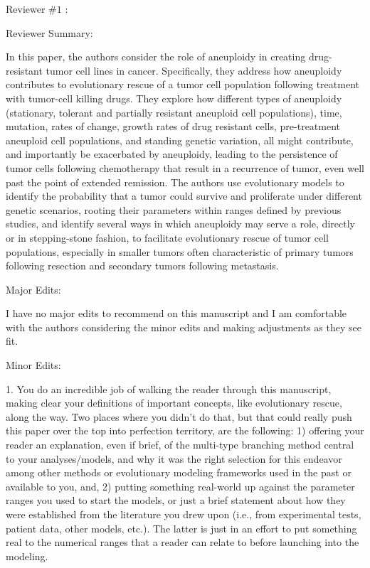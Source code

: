 \documentclass[11pt,a4paper]{article}
\begin{document}
Reviewer $\#1$ :

Reviewer Summary:

In this paper, the authors consider the role of aneuploidy in creating drug-resistant tumor cell lines in cancer. Specifically, they address how aneuploidy contributes to evolutionary rescue of a tumor cell population following treatment with tumor-cell killing drugs. They explore how different types of aneuploidy (stationary, tolerant and partially resistant aneuploid cell populations), time, mutation, rates of change, growth rates of drug resistant cells, pre-treatment aneuploid cell populations, and standing genetic variation, all might contribute, and importantly be exacerbated by aneuploidy, leading to the persistence of tumor cells following chemotherapy that result in a recurrence of tumor, even well past the point of extended remission. The authors use evolutionary models to identify the probability that a tumor could survive and proliferate under different genetic scenarios, rooting their parameters within ranges defined by previous studies, and identify several ways in which aneuploidy may serve a role, directly or in stepping-stone fashion, to facilitate evolutionary rescue of tumor cell populations, especially in smaller tumors often characteristic of primary tumors following resection and secondary tumors following metastasis.

Major Edits:

I have no major edits to recommend on this manuscript and I am comfortable with the authors considering the minor edits and making adjustments as they see fit.

Minor Edits:

1. You do an incredible job of walking the reader through this manuscript, making clear your definitions of important concepts, like evolutionary rescue, along the way. Two places where you didn't do that, but that could really push this paper over the top into perfection territory, are the following: 1) offering your reader an explanation, even if brief, of the multi-type branching method central to your analyses/models, and why it was the right selection for this endeavor among other methods or evolutionary modeling frameworks used in the past or available to you, and, 2) putting something real-world up against the parameter ranges you used to start the models, or just a brief statement about how they were established from the literature you drew upon (i.e., from experimental tests, patient data, other models, etc.). The latter is just in an effort to put something real to the numerical ranges that a reader can relate to before launching into the modeling.
\end{document}
